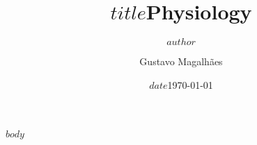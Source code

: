 \documentclass{article}
\author{$author$}
\author{Gustavo Magalhães}
\title{$title$}
\title{Physiology}
\date{$date$}
\date{\today}
\begin{document}
\maketitle

$body$

\newpage

\printbibliography
\end{document}
